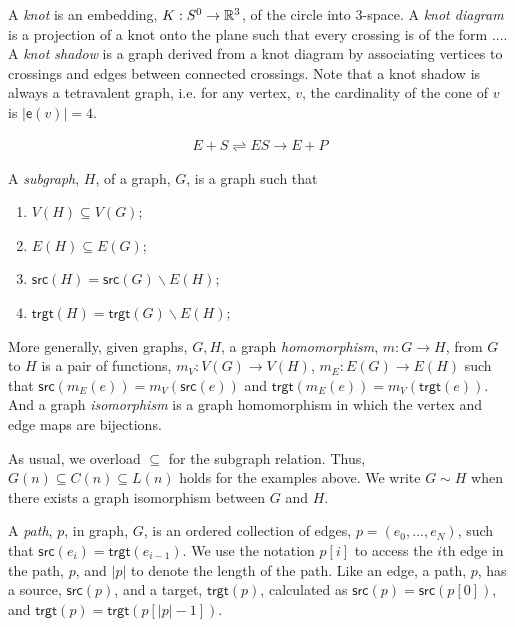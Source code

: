 \documentclass[]{llncs}
\begin{document}
\begin{example} \label{knotex}
  A \emph{knot} is an embedding, $K : S^0 \to \mathbb{R}^3$, of the circle
  into 3-space. A \emph{knot diagram} is a projection of a knot onto
  the plane such that every crossing is of the form .... A \emph{knot
    shadow} is a graph derived from a knot diagram by associating
  vertices to crossings and edges between connected crossings. Note
  that a knot shadow is always a tetravalent graph, i.e. for any
  vertex, $v$, the cardinality of the cone of $v$ is $|\textsf{e}(v)|
  = 4$.
\end{example}

\begin{example} \label{chemex}
  \begin{eqnarray}
    E + S \rightleftharpoons ES \rightarrow E + P
  \end{eqnarray}
\end{example}

\begin{definition}
  A \emph{subgraph}, $H$, of a graph, $G$, is a graph such that
  \begin{enumerate}
     \item $V(H) \subseteq V(G)$;
     \item $E(H) \subseteq E(G)$;
     \item $\textsf{src}(H) = \textsf{src}(G) \backslash E(H)$;
     \item $\textsf{trgt}(H) = \textsf{trgt}(G) \backslash E(H)$;
  \end{enumerate}
  More generally, given graphs, $G, H$, a graph \emph{homomorphism},
  $m: G \to H$, from $G$ to $H$ is a pair of functions, $m_V : V(G)
  \to V(H)$, $m_E : E(G) \to E(H)$ such that $\textsf{src}(m_E(e)) =
  m_V(\textsf{src}(e))$ and $\textsf{trgt}(m_E(e)) =
  m_V(\textsf{trgt}(e))$. And a graph \emph{isomorphism} is a graph
  homomorphism in which the vertex and edge maps are bijections.
\end{definition}

As usual, we overload $\subseteq$ for the subgraph relation. Thus,
$G(n) \subseteq C(n) \subseteq L(n)$ holds for the examples above. We
write $G \sim H$ when there exists a graph isomorphism between $G$ and
$H$.

\begin{definition}
  A \emph{path}, $p$, in graph, $G$, is an ordered collection of
  edges, $p = (e_0, ..., e_N)$, such that $\textsf{src}(e_i) =
  \textsf{trgt}(e_{i-1})$. We use the notation $p[i]$ to access the
  $i$th edge in the path, $p$, and $|p|$ to denote the length of the
  path. Like an edge, a path, $p$, has a source, $\textsf{src}(p)$,
  and a target, $\textsf{trgt}(p)$, calculated as $\textsf{src}(p) =
  \textsf{src}(p[0])$, and $\textsf{trgt}(p) =
  \textsf{trgt}(p[|p|-1])$.
\end{definition}
\end{document}

